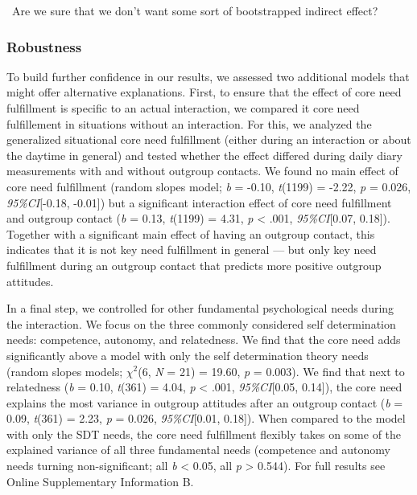 \faQuestionCircle~Are we sure that we don't want some sort of
bootstrapped indirect effect?

\subsubsection{Robustness}

To build further confidence in our results, we assessed two additional
models that might offer alternative explanations. First, to ensure that
the effect of core need fulfillment is specific to an actual
interaction, we compared it core need fulfillement in situations without
an interaction. For this, we analyzed the generalized situational core
need fulfillment (either during an interaction or about the daytime in
general) and tested whether the effect differed during daily diary
measurements with and without outgroup contacts. We found no main effect
of core need fulfillment (random slopes model; \textit{b} = -0.10,
\textit{t}(1199) = -2.22, \textit{p} = 0.026, \textit{95\%CI}{[}-0.18,
-0.01{]}) but a significant interaction effect of core need fulfillment
and outgroup contact (\textit{b} = 0.13, \textit{t}(1199) = 4.31,
\textit{p} \textless{} .001, \textit{95\%CI}{[}0.07, 0.18{]}). Together
with a significant main effect of having an outgroup contact, this
indicates that it is not key need fulfillment in general --- but only
key need fulfillment during an outgroup contact that predicts more
positive outgroup attitudes.

In a final step, we controlled for other fundamental psychological needs
during the interaction. We focus on the three commonly considered self
determination needs: competence, autonomy, and relatedness. We find that
the core need adds significantly above a model with only the self
determination theory needs (random slopes models; \(\chi^2\)(6,
\textit{N} = 21) = 19.60, \textit{p} = 0.003). We find that next to
relatedness (\textit{b} = 0.10, \textit{t}(361) = 4.04, \textit{p}
\textless{} .001, \textit{95\%CI}{[}0.05, 0.14{]}), the core need
explains the most variance in outgroup attitudes after an outgroup
contact (\textit{b} = 0.09, \textit{t}(361) = 2.23, \textit{p} = 0.026,
\textit{95\%CI}{[}0.01, 0.18{]}). When compared to the model with only
the SDT needs, the core need fulfillment flexibly takes on some of the
explained variance of all three fundamental needs (competence and
autonomy needs turning non-significant; all \textit{b} \textless{} 0.05,
all \textit{p} \textgreater{} 0.544). For full results see Online
Supplementary Information B.

